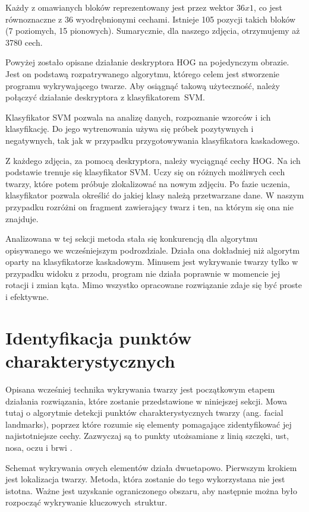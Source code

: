 Każdy z omawianych bloków reprezentowany jest przez wektor $36x1$, co jest równoznaczne z 36 wyodrębnionymi cechami. Istnieje 105 pozycji takich bloków (7 poziomych, 15 pionowych). Sumarycznie, dla naszego zdjęcia, otrzymujemy aż 3780 cech.

Powyżej zostało opisane działanie deskryptora HOG na pojedynczym obrazie. Jest on podstawą rozpatrywanego algorytmu, którego celem jest stworzenie programu wykrywającego twarze. Aby osiągnąć takową użyteczność, należy połączyć działanie deskryptora z klasyfikatorem~SVM.

Klasyfikator SVM pozwala na analizę danych, rozpoznanie wzorców i ich klasyfikację. Do jego wytrenowania używa się próbek pozytywnych i negatywnych, tak jak w przypadku przygotowywania klasyfikatora kaskadowego.

Z każdego zdjęcia, za pomocą deskryptora, należy wyciągnąć cechy HOG. Na ich podstawie trenuje się klasyfikator SVM. Uczy się on różnych możliwych cech twarzy, które potem próbuje zlokalizować na nowym zdjęciu. Po fazie uczenia, klasyfikator pozwala określić do jakiej klasy należą przetwarzane dane. W naszym przypadku rozróżni on fragment zawierający twarz i ten, na którym się ona nie znajduje. 

Analizowana w tej sekcji metoda stała się konkurencją dla algorytmu opisywanego we wcześniejszym podrozdziale. Działa ona dokładniej niż algorytm oparty na klasyfikatorze kaskadowym. Minusem jest wykrywanie twarzy tylko w przypadku widoku z przodu, program nie działa poprawnie w momencie jej rotacji i zmian kąta. Mimo wszystko opracowane rozwiązanie zdaje się być proste i efektywne.
\newpage

\section{Identyfikacja punktów charakterystycznych}
\label{sec:landmarks}
Opisana wcześniej technika wykrywania twarzy jest początkowym etapem działania rozwiązania, które zostanie przedstawione w niniejszej sekcji. Mowa tutaj o algorytmie detekcji punktów charakterystycznych twarzy (ang. facial landmarks), poprzez które rozumie się elementy pomagające zidentyfikować jej najistotniejsze cechy. Zazwyczaj są to punkty utożsamiane z linią szczęki, ust, nosa, oczu i brwi \cite{landmarks2}.

Schemat wykrywania owych elementów działa dwuetapowo. Pierwszym krokiem jest lokalizacja twarzy. Metoda, która zostanie do tego wykorzystana nie jest istotna. Ważne jest uzyskanie ograniczonego obszaru, aby następnie można było rozpocząć wykrywanie kluczowych~struktur. 

